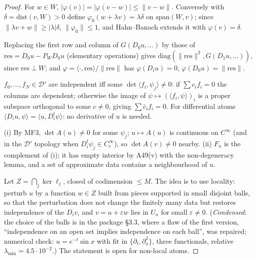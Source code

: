 \begin{proof}
For $w\in W$, $|\varphi(v)|=|\varphi(v-w)|\le\|v-w\|$. Conversely with $\delta=\mathrm{dist}(v,W)>0$ define $\varphi_0(w+\lambda v)=\lambda\delta$ on $\mathrm{span}(W,v)$; since $\|\lambda v+w\|\ge|\lambda|\delta$, $\|\varphi_0\|\le1$, and Hahn--Banach extends it with $\varphi(v)=\delta$.

Replacing the first row and column of $G(D_0u,\dots)$ by those of $\mathrm{res}=D_0u-P_WD_0u$ (elementary operations) gives $\mathrm{diag}(\|\mathrm{res}\|^2,G(D_1u,\dots))$, since $\mathrm{res}\perp W$; and $\varphi=\langle\cdot,\mathrm{res}\rangle/\|\mathrm{res}\|$ has $\varphi(D_iu)=0$, $\varphi(D_0u)=\|\mathrm{res}\|$.

$f_0,\dots,f_N\in\mathcal D'$ are independent iff some $\det\langle f_i,\psi_j\rangle\ne0$: if $\sum c_if_i=0$ the columns are dependent; otherwise the image of $\psi\mapsto(\langle f_i,\psi\rangle)_i$ is a proper subspace orthogonal to some $c\ne0$, giving $\sum\bar c_if_i=0$. For differential atoms $\langle D_iu,\psi\rangle=\langle u,D_i^t\psi\rangle$: no derivative of $u$ is needed.

(i) By MF3, $\det A(u)\ne0$ for some $\psi_j$; $u\mapsto A(u)$ is continuous on $C^\infty$ (and in the $\mathcal D'$ topology when $D_i^t\psi_j\in C_c^\infty$), so $\det A(v)\ne0$ nearby. (ii) $F_n$ is the complement of (i); it has empty interior by A49(v) with the non-degeneracy lemma, and a set of approximate data contains a neighbourhood of $u$.

Let $Z=\bigcap_j\ker\ell_j$, closed of codimension $\le M$. The idea is to use locality: perturb $u$ by a function $w\in Z$ built from pieces supported in small disjoint balls, so that the perturbation does not change the finitely many data but restores independence of the $D_iv$, and $v=u+\varepsilon w$ lies in $U_n$ for small $\varepsilon\ne0$. (\emph{Condensed}: the choice of the balls is in the package \S3.3, where a flaw of the first version, ``independence on an open set implies independence on each ball'', was repaired; numerical check: $u=e^{-t}\sin x$ with fit in $\{\partial_t,\partial_x^2\}$, three functionals, relative $\lambda_{\min}=4.5\cdot10^{-2}$.) The statement is open for non-local atoms.

\end{proof}

